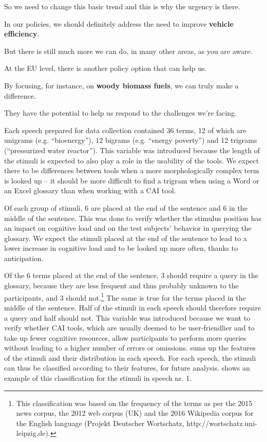 \documentclass[output=paper]{langsci/langscibook}
\begin{document}
So we need to change this basic trend and this is why the urgency is there.

In our policies, we should definitely address the need to improve \textbf{vehicle efficiency}.

But there is still much more we can do, in many other areas, as you are aware.

At the EU level, there is another policy option that can help us.

By focusing, for instance, on \textbf{woody biomass fuels}, we can truly make a difference.

They have the potential to help us respond to the challenges we’re facing.

Each speech prepared for data collection contained 36 terms, 12 of which are unigrams (e.g. “bioenergy”), 12 bigrams (e.g. “energy poverty”) and 12 trigrams (“pressurized water reactor”). This variable was introduced because the length of the stimuli is expected to also play a role in the usability of the tools. We expect there to be differences between tools when a more morphologically complex term is looked up – it should be more difficult to find a trigram when using a Word or an Excel glossary than when working with a CAI tool. 

Of each group of stimuli, 6 are placed at the end of the sentence and 6 in the middle of the sentence. This was done to verify whether the stimulus position has an impact on cognitive load and on the test subjects’ behavior in querying the glossary. We expect the stimuli placed at the end of the sentence to lead to a lower increase in cognitive load and to be looked up more often, thanks to anticipation. 

Of the 6 terms placed at the end of the sentence, 3 should require a query in the glossary, because they are less frequent and thus probably unknown to the participants, and 3 should not.\footnote{This classification was based on the frequency of the terms as per the 2015 news corpus, the 2012 web corpus (UK) and the 2016 Wikipedia corpus for the English language (Projekt Deutscher Wortschatz, http://wortschatz.uni-leipzig.de).} The same is true for the terms placed in the middle of the sentence. Half of the stimuli in each speech should therefore require a query and half should not. This variable was introduced because we want to verify whether CAI tools, which are usually deemed to be user-friendlier and to take up fewer cognitive resources, allow participants to perform more queries without leading to a higher number of errors or omissions.  sums up the features of the stimuli and their distribution in each speech. For each speech, the stimuli can thus be classified according to their features, for future analysis.  shows an example of this classification for the stimuli in speech nr. 1.
\end{document}
